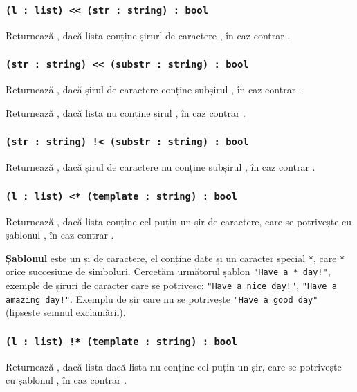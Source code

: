 \subsubsection{\lstinline|(l : list) << (str : string) : bool|}

Returnează \true{}, dacă lista  conține șirurl de caractere , în caz contrar \false{}.

\subsubsection{\lstinline|(str : string) << (substr : string) : bool|}

Returnează \true{}, dacă șirul de caractere  conține subșirul , în caz contrar \false{}.

Returnează \true{}, dacă lista  nu conține șirul , în caz contrar \false{}.

\subsubsection{\lstinline|(str : string) !< (substr : string) : bool|}

Returnează \true{}, dacă șirul de caractere  nu conține subșirul , în caz contrar \false{}.

\subsubsection{\lstinline|(l : list) <* (template : string) : bool|}

Returnează \true{}, dacă lista  conține cel puțin un șir de caractere, care se potrivește cu șablonul , în caz contrar \false{}.

{\bf Șablonul} este un și de caractere, el conține date și un caracter special \lstinline`*`, care \lstinline`*` orice succesiune de simboluri. Cercetăm următorul șablon \lstinline|"Have a * day!"|, exemple de șiruri de caracter care se potrivesc: \lstinline|"Have a nice day!"|, \lstinline|"Have a amazing day!"|. Exemplu de șir care nu se potrivește \lstinline|"Have a good day"| (lipsește semnul exclamării).

\subsubsection{\lstinline|(l : list) !* (template : string) : bool|}

Returnează \true{}, dacă lista  dacă lista nu conține cel puțin un șir, care se potrivește cu șablonul , în caz contrar \false{}.

